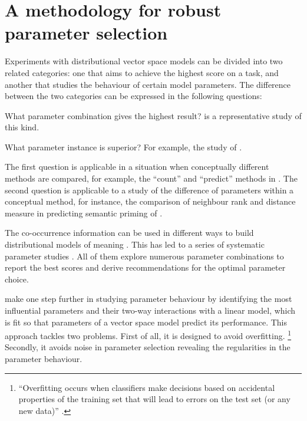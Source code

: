 \chapter{A methodology for robust parameter selection}
\label{sec:methodology}

Experiments with distributional vector space models can be divided into two related categories: one that aims to achieve the highest score on a task, and another that studies the behaviour of certain model parameters. The difference between the two categories can be expressed in the following questions:

\begin{compactitem}
\item What parameter combination gives the highest result?  is a representative study of this kind.
\item What parameter instance is superior? For example, the study of .
\end{compactitem}

The first question is applicable in a situation when conceptually different methods are compared, for example, the ``count'' and  ``predict'' methods in . The second question is applicable to a study of the difference of parameters within a conceptual method, for instance, the comparison of neighbour rank and distance measure in predicting semantic priming of .

The co-occurrence information can be used in different ways to build distributional models of meaning \cite{Turney:2010:FMV:1861751.1861756}. This has led to a series of  systematic parameter studies \cite{Bullinaria2007,BullinariaLevy2012,kiela-clark:2014:CVSC,lapesa2014large,TACL570}. All of them explore numerous parameter combinations to report the best scores and derive recommendations for the optimal parameter choice.

 make one step further in studying parameter behaviour by identifying the most influential parameters and their two-way interactions with a linear model, which is fit so that parameters of a vector space model predict its performance. This approach tackles two problems. First of all, it is designed to avoid overfitting.%
\footnote{``Overfitting occurs when classifiers make decisions based on accidental properties of the training set that will lead to errors on the test set (or any new data)'' .}
Secondly, it avoids noise in parameter selection revealing the regularities in the parameter behaviour.

